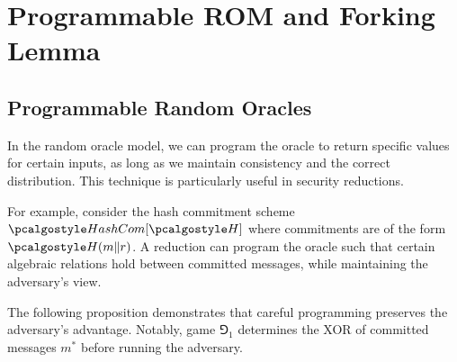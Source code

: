 \section{Programmable ROM and Forking Lemma}\label{sec:prog-rom}

\subsection{Programmable Random Oracles}

In the random oracle model, we can program the oracle to return specific values for certain inputs, as long as we maintain consistency and the correct distribution.
This technique is particularly useful in security reductions.

For example, consider the hash commitment scheme $\algo{HashCom}[\algo{H}]$ where commitments are of the form $\algo{H}(m \| r)$.
A reduction can program the oracle such that certain algebraic relations hold between committed messages, while maintaining the adversary's view.

The following proposition demonstrates that careful programming preserves the adversary's advantage. Notably, game $\Game_1$ determines the XOR of committed messages $m^*$ before running the adversary.

